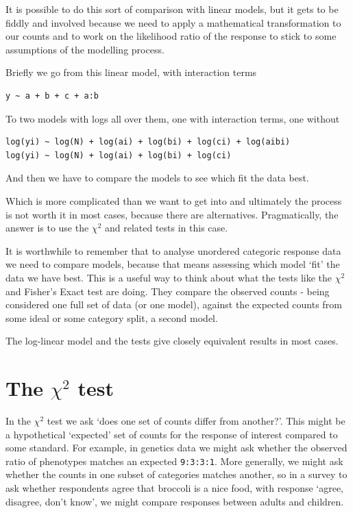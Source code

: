 \documentclass[
]{book}
\begin{document}
It is possible to do this sort of comparison with linear models, but it gets to be fiddly and involved because we need to apply a mathematical transformation to our counts and to work on the likelihood ratio of the response to stick to some assumptions of the modelling process.

Briefly we go from this linear model, with interaction terms

\begin{verbatim}
y ~ a + b + c + a:b
\end{verbatim}

To two models with logs all over them, one with interaction terms, one without

\begin{verbatim}
log(yi) ~ log(N) + log(ai) + log(bi) + log(ci) + log(aibi)
log(yi) ~ log(N) + log(ai) + log(bi) + log(ci)
\end{verbatim}

And then we have to compare the models to see which fit the data best.

Which is more complicated than we want to get into and ultimately the process is not worth it in most cases, because there are alternatives. Pragmatically, the answer is to use the \(\chi^2\) and related tests in this case.

It is worthwhile to remember that to analyse unordered categoric response data we need to compare models, because that means assessing which model `fit' the data we have best. This is a useful way to think about what the tests like the \(\chi^2\) and Fisher's Exact test are doing. They compare the observed counts - being considered one full set of data (or one model), against the expected counts from some ideal or some category split, a second model.

The log-linear model and the tests give closely equivalent results in most cases.

\hypertarget{the-chi2-test}{%
\section{\texorpdfstring{The \(\chi^2\) test}{The \textbackslash chi\^{}2 test}}\label{the-chi2-test}}

In the \(\chi^2\) test we ask `does one set of counts differ from another?'. This might be a hypothetical `expected' set of counts for the response of interest compared to some standard.
For example, in genetics data we might ask whether the observed ratio of phenotypes matches an expected \texttt{9:3:3:1}. More generally, we might ask whether the counts in one subset of categories matches another, so in a survey to ask whether respondents agree that broccoli is a nice food, with response `agree, disagree, don't know', we might compare responses between adults and children.
\end{document}
